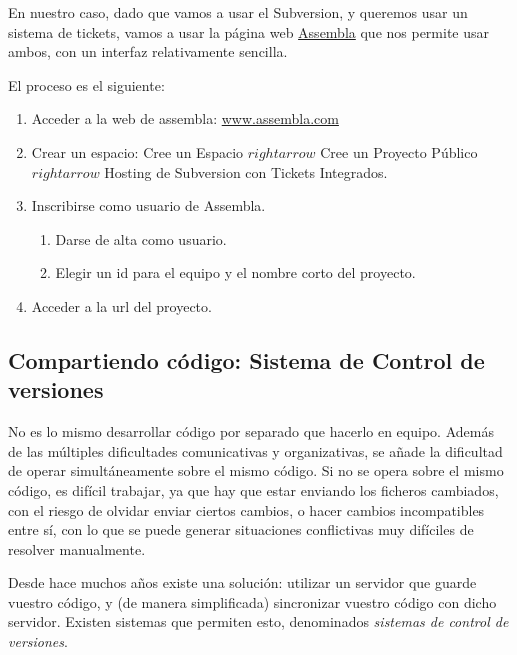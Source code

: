 \documentclass[11pt]{article}
\begin{document}
En nuestro caso, dado que vamos a usar el Subversion, y queremos usar un sistema
de tickets, vamos a usar la página web \href{http://www.assembla.com}{Assembla}
que nos permite usar ambos, con un interfaz relativamente sencilla.

El proceso es el siguiente:

\begin{enumerate}

\item Acceder a la web de assembla: \href{http://www.assembla.com}{www.assembla.com}

\item Crear un espacio: Cree un Espacio $rightarrow$ Cree un Proyecto Público $rightarrow$ Hosting de Subversion con Tickets Integrados.

\item Inscribirse como usuario de Assembla.

\begin{enumerate}
  \item Darse de alta como usuario.
  \item Elegir un id para el equipo y el nombre corto del proyecto.
\end{enumerate}

\item Acceder a la url del proyecto.

\end{enumerate}


\subsection{Compartiendo código: Sistema de Control de versiones}
\label{sec-7-2} \label{scv}

No es lo mismo desarrollar código por separado que hacerlo en equipo. Además de las múltiples dificultades
comunicativas y organizativas, se añade la dificultad de operar simultáneamente sobre el mismo
código. Si no se opera sobre el mismo código, es difícil trabajar, ya que hay que
estar enviando los ficheros cambiados, con el riesgo de olvidar enviar ciertos cambios, o hacer cambios incompatibles entre sí, con lo que se puede generar situaciones conflictivas muy difíciles de resolver manualmente.

Desde hace muchos años existe una solución: utilizar un servidor
que guarde vuestro código, y (de manera simplificada) sincronizar vuestro código con dicho servidor.
Existen sistemas que permiten esto, denominados \emph{sistemas de control de
versiones}.
\end{document}
